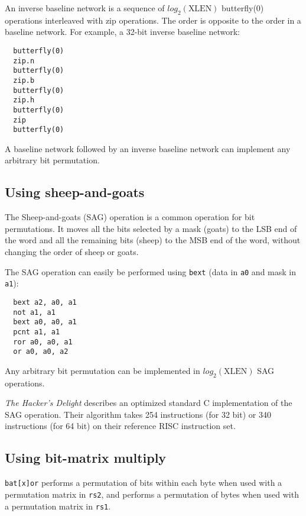 An inverse baseline network is a sequence of $log_2(\textrm{XLEN})$ butterfly(0)
operations interleaved with zip operations. The order is opposite to the
order in a baseline network. For example, a 32-bit inverse baseline network:

\begin{verbatim}
  butterfly(0)
  zip.n
  butterfly(0)
  zip.b
  butterfly(0)
  zip.h
  butterfly(0)
  zip
  butterfly(0)
\end{verbatim}

A baseline network followed by an inverse baseline network can implement
any arbitrary bit permutation.


\subsection{Using sheep-and-goats}
\label{SAG}

The Sheep-and-goats (SAG) operation is a common operation for bit permutations.
It moves all the bits selected by a mask (goats) to the LSB end of the word
and all the remaining bits (sheep) to the MSB end of the word, without changing
the order of sheep or goats.

The SAG operation can easily be performed using {\tt bext} (data in {\tt a0} and
mask in {\tt a1}):

\begin{verbatim}
  bext a2, a0, a1
  not a1, a1
  bext a0, a0, a1
  pcnt a1, a1
  ror a0, a0, a1
  or a0, a0, a2
\end{verbatim}

Any arbitrary bit permutation can be implemented in $log_2(\textrm{XLEN})$ SAG
operations.

{\it The Hacker's Delight} describes an optimized standard C implementation of
the SAG operation. Their algorithm takes 254 instructions (for 32 bit) or 340
instructions (for 64 bit) on their reference RISC instruction
set.~\cite[p.~152f,~162f]{Seander05}


\subsection{Using bit-matrix multiply}

{\tt bat[x]or} performs a permutation of bits within each byte when used with a
permutation matrix in {\tt rs2}, and performs a permutation of bytes when used
with a permutation matrix in {\tt rs1}.

